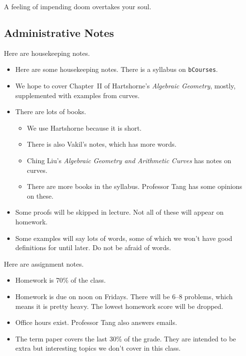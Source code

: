 \documentclass[../notes.tex]{subfiles}
\begin{document}
A feeling of impending doom overtakes your soul.

\subsection{Administrative Notes}
Here are housekeeping notes.
\begin{itemize}
	\item Here are some housekeeping notes. There is a syllabus on \texttt{bCourses}.
	\item We hope to cover Chapter~II of Hartshorne's \textit{Algebraic Geometry}, mostly, supplemented with examples from curves.
	\item There are lots of books.
	\begin{itemize}
		\item We use Hartshorne because it is short.
		\item There is also Vakil's notes, which has more words.
		\item Ching Liu's \textit{Algebraic Geometry and Arithmetic Curves} has notes on curves.
		\item There are more books in the syllabus. Professor Tang has some opinions on these.
	\end{itemize}
	\item Some proofs will be skipped in lecture. Not all of these will appear on homework.
	\item Some examples will say lots of words, some of which we won't have good definitions for until later. Do not be afraid of words.
\end{itemize}
Here are assignment notes.
\begin{itemize}
	\item Homework is 70\% of the class.
	\item Homework is due on noon on Fridays. There will be 6--8 problems, which means it is pretty heavy. The lowest homework score will be dropped.
	\item Office hours exist. Professor Tang also answers emails.
	\item The term paper covers the last 30\% of the grade. They are intended to be extra but interesting topics we don't cover in this class.
\end{itemize}
\end{document}
